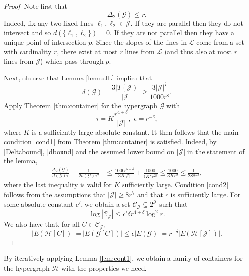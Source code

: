 \documentclass[11pt]{amsart}
\newcommand{\cL}{\mathcal{L}}
\newcommand{\cH}{\mathcal{H}}
\newcommand{\cG}{\mathcal{G}}
\newcommand{\cJ}{\mathcal{J}}
\newcommand{\cC}{\mathcal{C}}
\theoremstyle{remark}
\begin{document}
\begin{proof} 
    Note first that 
    \begin{equation} \label{Deltabound}
    \Delta_2(\cG) \leq r.
    \end{equation} 
    Indeed, fix any two fixed lines $\ell_1,\ell_2 \in \cJ$. If they are parallel then they do not intersect and so $d(\{ \ell_1,\ell_2\})=0$. If they are not parallel then they have a unique point of intersection $p$. Since the slopes of the lines in $\cL$ come from a set with cardinality $r$, there exist at most $r$ lines from $\cL$ (and thus also at most $r$ lines from $\cJ$) which pass through $p$.

    Next, observe that Lemma \ref{lem:sslL} implies that
    \begin{equation} \label{dbound}
    d(\cG) = \frac{3|T(\cJ)|}{|\cJ|} \geq \frac{3|\cJ|^2}{1000r^8}.
    \end{equation}
    Apply Theorem \ref{thm:container} for the hypergraph $\cG$ with
    \[
    \tau=K \frac{r^{4+ \delta}}{|\cJ|}, \,\, \epsilon= r^{-\delta},
    \]
    where $K$ is a sufficiently large absolute constant. It then follows that the main condition \eqref{cond1} from Theorem \ref{thm:container} is satisfied. Indeed, by \eqref{Deltabound}, \eqref{dbound} and the assumed lower bound on $|\cJ|$ in the statement of the lemma, 
    \begin{align*}
    \frac{\Delta_2(\cG)}{d(\cG) \tau} + \frac{1}{2d(\cG) \tau^2} & \leq \frac{1000r^{5-\delta}}{3K|\cJ|} + \frac{1000}{6K^2r^{2\delta}}
     \leq \frac{1000}{3Kr^{\delta}} \leq \frac{1}{288r^{\delta}},
    \end{align*}
    where the last inequality is valid for $K$ sufficiently large.
    Condition \eqref{cond2} follows from the assumptions that $|\cJ| \geq 8r^7$ and that $r$ is sufficiently large. For some absolute constant $c'$, we obtain a set $\mathcal C_{\cJ} \subseteq 2^{\cJ}$ such that
    \[
    \log | \cC_{\cJ}| \leq c'\delta r^{4+\delta} \log ^2r.
    \]
    We also have that, for all $C \in  \cC_{\cJ}$,
    \[
    |E(\cH[C])|=|E( \cG[C])| \leq \epsilon |E(\cG)|=r^{-\delta}|E(\cH[\cJ])|.
    \]

    \end{proof}

By iteratively applying Lemma \ref{lem:cont1}, we obtain a family of containers for the hypergraph $\cH$ with the properties we need.
\end{document}
